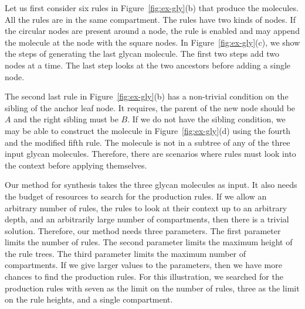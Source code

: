 Let us first consider six rules in Figure~\ref{fig:ex-gly}(b)
that produce the molecules.
All the rules are in the same compartment.
The rules have two kinds of nodes.
If the circular nodes are present around a node,
the rule is enabled and may append the molecule at the
node with the square nodes.
In Figure~\ref{fig:ex-gly}(c), we show the steps of generating the last
glycan molecule.
The first two steps add two nodes at a time.
The last step looks at the two ancestors before adding a single node.

The second last rule in Figure~\ref{fig:ex-gly}(b) has a non-trivial condition
on the sibling of the anchor leaf node.
It requires, the parent of the new node should be $A$ and the right sibling
must be $B$.
If we do not have the sibling condition, we may be able to construct the molecule
in Figure~\ref{fig:ex-gly}(d) using the fourth and the modified fifth rule.
The molecule is not in a subtree of any of the three input glycan molecules.
Therefore, there are scenarios where rules must look into the context before applying
themselves.



Our method for synthesis takes the three glycan molecules as input.
It also needs the budget of resources to search for the production rules.
If we allow an arbitrary number of rules,
the rules to look at their context up to
an arbitrary depth, and an arbitrarily large number of compartments,
then there is a trivial solution.
Therefore, our method needs three parameters.
The first parameter limits the number of rules.
The second parameter limits the maximum height of the rule trees.
The third parameter limits the maximum number of compartments.
If we give larger values to the parameters, then we have more chances to
find the production rules.
For this illustration, we searched for the production rules with
seven as the limit on the number of rules, three as the limit on the rule heights,
and a single compartment.

